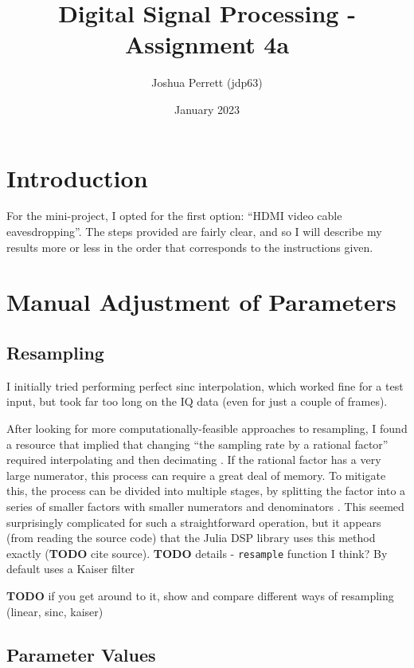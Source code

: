 \documentclass{article}
\title{Digital Signal Processing - Assignment 4a}
\author{Joshua Perrett (jdp63)}
\date{January 2023}
\newcommand*{\code}[1]{\texttt{#1}}
\newcommand*{\TODO}{\textbf{TODO}\xspace}
\begin{document}
\maketitle

\section*{Introduction}

For the mini-project, I opted for the first option: ``HDMI video cable eavesdropping''. The steps provided are fairly clear, and so I will describe my results more or less in the order that corresponds to the instructions given.

\section*{Manual Adjustment of Parameters}

\subsection*{Resampling}

I initially tried performing perfect sinc interpolation, which worked fine for a test input, but took far too long on the IQ data (even for just a couple of frames).


After looking for more computationally-feasible approaches to resampling, I found a resource that implied that changing ``the sampling rate by a rational factor'' required interpolating and then decimating \cite{dspguru-resampling}. If the rational factor has a very large numerator, this process can require a great deal of memory. To mitigate this, the process can be divided into multiple stages, by splitting the factor into a series of smaller factors with smaller numerators and denominators \cite{dspguru-resampling}. This seemed surprisingly complicated for such a straightforward operation, but it appears (from reading the source code) that the Julia DSP library uses this method exactly (\TODO cite source). \TODO details - \code{resample} function I think? By default uses a Kaiser filter

\textbf{TODO} if you get around to it, show and compare different ways of resampling (linear, sinc, kaiser)

\subsection*{Parameter Values}
\end{document}
